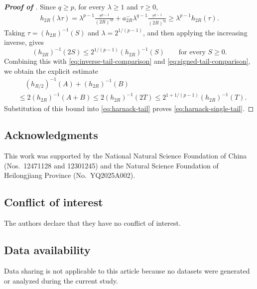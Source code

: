 \documentclass[reqno]{amsart}
\theoremstyle{plain}
\theoremstyle{definition}
\theoremstyle{remark}
\numberwithin{equation}{section}
\begin{document}
\begin{proof}[\textbf{Proof of }]
Since \(q\ge p\), for every \(\lambda\ge1\) and \(\tau\ge0\),
\[
\begin{aligned}
    h_{2R}(\lambda\tau)=\lambda^{p-1}\frac{\tau^{p-1}}{(2R)^{sp}}
      +a_{2R}^-\lambda^{q-1}\frac{\tau^{q-1}}{(2R)^{tq}}
    \ge \lambda^{p-1}h_{2R}(\tau).
\end{aligned}
\]
Taking \(\tau=(h_{2R})^{-1}(S)\) and
\(\lambda=2^{1/(p-1)}\), and then applying the increasing inverse, gives
\[
    (h_{2R})^{-1}(2S)
    \le 2^{1/(p-1)}(h_{2R})^{-1}(S)
    \qquad\text{for every }S\ge0.
\]
Combining this with \eqref{eq:inverse-tail-comparison} and \eqref{eq:signed-tail-comparison}, we obtain the explicit estimate
\[
\begin{aligned}
    &\quad (h_{R/2})^{-1}(A)+(h_{2R})^{-1}(B)\\
    &\le2(h_{2R})^{-1}(A+B)
     \le2(h_{2R})^{-1}(2T)
     \le2^{1+1/(p-1)}(h_{2R})^{-1}(T).
\end{aligned}
\]
Substitution of this bound into \eqref{eq:harnack-tail} proves \eqref{eq:harnack-single-tail}. %
\end{proof}



\subsection*{Acknowledgments}
This work was supported by the National Natural Science Foundation of China
(Nos.~12471128 and 12301245) and the Natural Science Foundation of
Heilongjiang Province (No.~YQ2025A002).

\subsection*{Conflict of interest}
The authors declare that they have no conflict of interest.

\subsection*{Data availability}
Data sharing is not applicable to this article because no datasets were
generated or analyzed during the current study.
\end{document}
